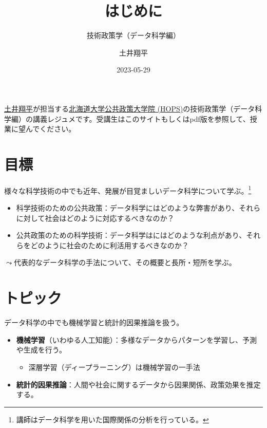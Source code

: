 \documentclass[
  xelatex,
  ja=standard]{bxjsarticle}
\title{はじめに}
\subtitle{技術政策学（データ科学編）}
\author{土井翔平}
\date{2023-05-29}
\providecommand{\tightlist}{%
  \setlength{\itemsep}{0pt}\setlength{\parskip}{0pt}}\usepackage{longtable,booktabs,array}
\begin{document}
\maketitle
\ifdefined\Shaded\renewenvironment{Shaded}{\begin{tcolorbox}[sharp corners, interior hidden, enhanced, frame hidden, breakable, borderline west={3pt}{0pt}{shadecolor}, boxrule=0pt]}{\end{tcolorbox}}\fi

\href{https://shohei-doi.github.io}{土井翔平}が担当する\href{https://www.hops.hokudai.ac.jp/}{北海道大学公共政策大学院
(HOPS)}の技術政策学（データ科学編）の講義レジュメです。受講生はこのサイトもしくはpdf版を参照して、授業に望んでください。

\hypertarget{ux76eeux6a19}{%
\section{目標}\label{ux76eeux6a19}}

様々な科学技術の中でも近年、発展が目覚ましいデータ科学について学ぶ。\footnote{講師はデータ科学を用いた国際関係の分析を行っている。}

\begin{itemize}
\tightlist
\item
  科学技術のための公共政策：データ科学にはどのような弊害があり、それらに対して社会はどのように対応するべきなのか？
\item
  公共政策のための科学技術：データ科学はにはどのような利点があり、それらをどのように社会のために利活用するべきなのか？
\end{itemize}

\(\leadsto\)代表的なデータ科学の手法について、その概要と長所・短所を学ぶ。

\hypertarget{ux30c8ux30d4ux30c3ux30af}{%
\section{トピック}\label{ux30c8ux30d4ux30c3ux30af}}

データ科学の中でも機械学習と統計的因果推論を扱う。

\begin{itemize}
\tightlist
\item
  \textbf{機械学習}（いわゆる人工知能）：多様なデータからパターンを学習し、予測や生成を行う。

  \begin{itemize}
  \tightlist
  \item
    深層学習（ディープラーニング）は機械学習の一手法
  \end{itemize}
\item
  \textbf{統計的因果推論}：人間や社会に関するデータから因果関係、政策効果を推定する。
\end{itemize}
\end{document}
